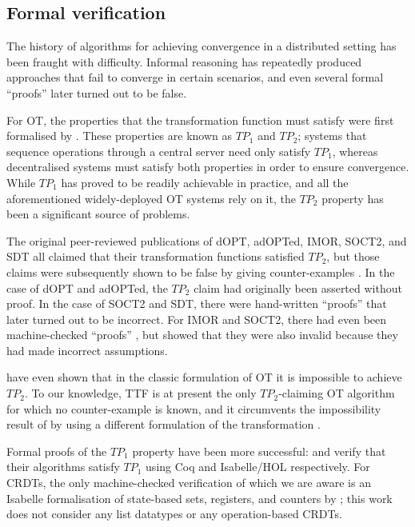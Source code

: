 \subsection{Formal verification}\label{sect.related.verification}

The history of algorithms for achieving convergence in a distributed setting has been fraught with difficulty.
Informal reasoning has repeatedly produced approaches that fail to converge in certain scenarios, and even several formal ``proofs'' later turned out to be false.

For OT, the properties that the transformation function must satisfy were first formalised by \citet{Ressel:1996wx}.
These properties are known as $\mathit{TP}_1$ and $\mathit{TP}_2$; systems that sequence operations through a central server need only satisfy $\mathit{TP}_1$, whereas decentralised systems must satisfy both properties in order to ensure convergence.
While $\mathit{TP}_1$ has proved to be readily achievable in practice, and all the aforementioned widely-deployed OT systems rely on it, the $\mathit{TP}_2$ property has been a significant source of problems.

The original peer-reviewed publications of dOPT, adOPTed, IMOR, SOCT2, and SDT all claimed that their transformation functions satisfied $\mathit{TP}_2$, but those claims were subsequently shown to be false by giving counter-examples \cite{Imine:2003ks,Imine:2006kn,Oster:2005vi}.
In the case of dOPT and adOPTed, the $\mathit{TP}_2$ claim had originally been asserted without proof.
In the case of SOCT2 and SDT, there were hand-written ``proofs'' that later turned out to be incorrect.
For IMOR and SOCT2, there had even been machine-checked ``proofs'' \cite{Imine:2003ks}, but \citet{Oster:2005vi} showed that they were also invalid because they had made incorrect assumptions.

\citet{Randolph:2015gj} have even shown that in the classic formulation of OT it is impossible to
achieve $\mathit{TP}_2$. To our knowledge, TTF is at present the only $\mathit{TP}_2$-claiming OT
algorithm for which no counter-example is known, and it circumvents the impossibility result of
\citet{Randolph:2015gj} by using a different formulation of the transformation
\cite{Oster:2006tr,Levien:2016wz}.

Formal proofs of the $\mathit{TP}_1$ property have been more successful: \citet{Sinchuk:2016cf} and \citet{Jungnickel:2015ua} verify that their algorithms satisfy $\mathit{TP}_1$ using Coq and Isabelle/HOL respectively.
For CRDTs, the only machine-checked verification of which we are aware is an Isabelle formalisation of state-based sets, registers, and counters by \citet{Zeller:2014fl}; this work does not consider any list datatypes or any operation-based CRDTs.

